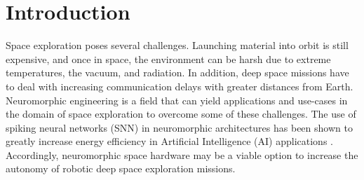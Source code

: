 \section{Introduction}\label{sec:introduction}
Space exploration poses several challenges. Launching material into orbit is still expensive, and once in space, the environment can be harsh due to extreme temperatures, the vacuum, and radiation. In addition, deep space missions have to deal with increasing communication delays with greater distances from Earth. Neuromorphic engineering is a field that can yield applications and use-cases in the domain of space exploration to overcome some of these challenges. The use of spiking neural networks (SNN) in neuromorphic architectures has been shown to greatly increase energy efficiency in Artificial Intelligence (AI) applications \cite{davies_loihi_2018}. Accordingly, neuromorphic space hardware may be a viable option to increase the autonomy of robotic deep space exploration missions. 

